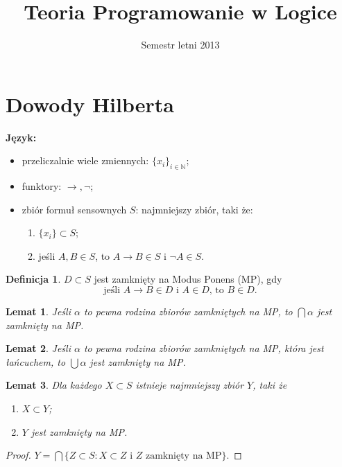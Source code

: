 \documentclass[10pt,a4paper]{article}
\title{Teoria Programowanie w Logice}
\author{}
\date{Semestr letni 2013}
\theoremstyle{plain}
\newtheorem{lemma}{Lemat}
\theoremstyle{definition}
\newtheorem*{definition}{Definicja}
\newcommand{\impl}{\rightarrow}
\newcommand{\N}{\mathbb{N}}
\newcommand{\header}[1]{\noindent\textbf{#1}}
\begin{document}
\maketitle

\section{Dowody Hilberta}

\header{Język:}

\begin{itemize}
  \item przeliczalnie wiele zmiennych: $\{x_i\}_{i\in\N}$;
  \item funktory: $\impl, \neg$;
  \item zbiór formuł sensownych $S$: najmniejszy zbiór, taki że:
  \begin{enumerate}
    \item $\{x_i\} \subset S$;
    \item jeśli $A, B \in S$, to $A \impl B \in S$ i $\neg A \in S$.
  \end{enumerate}
\end{itemize}

\begin{definition}
$D \subset S$ jest zamknięty na Modus Ponens (MP), gdy
$$\text{jeśli } A \impl B \in D \text{ i } A \in D \text{, to } B \in D.$$
\end{definition}

\begin{lemma}
Jeśli $\alpha$ to pewna rodzina zbiorów zamkniętych na MP,
to $\bigcap\alpha$ jest zamknięty na MP.
\end{lemma}

\begin{lemma}
Jeśli $\alpha$ to pewna rodzina zbiorów zamkniętych na MP, która jest łańcuchem,
to $\bigcup\alpha$ jest zamknięty na MP.
\end{lemma}

\begin{lemma}
Dla każdego $X \subset S$ istnieje najmniejszy zbiór $Y$, taki że
\begin{enumerate}
  \item $X \subset Y$;
  \item $Y$ jest zamknięty na MP.
\end{enumerate}
\end{lemma}

\begin{proof}
$Y = \bigcap \{
  Z \subset S : X \subset Z \text{ i } Z \text { zamknięty na MP}
\}.$
\end{proof}
\end{document}
